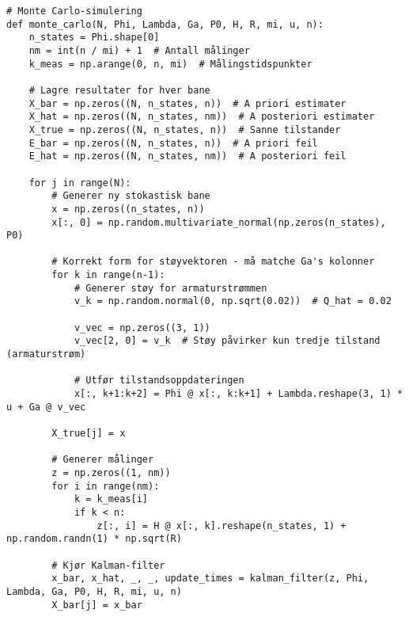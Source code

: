 \documentclass[a4paper,12pt]{article}
\theoremstyle{plain}
\begin{document}
\lstset{language=Python, numbers=left}
\begin{lstlisting}
# Monte Carlo-simulering
def monte_carlo(N, Phi, Lambda, Ga, P0, H, R, mi, u, n):
    n_states = Phi.shape[0]
    nm = int(n / mi) + 1  # Antall målinger
    k_meas = np.arange(0, n, mi)  # Målingstidspunkter

    # Lagre resultater for hver bane
    X_bar = np.zeros((N, n_states, n))  # A priori estimater
    X_hat = np.zeros((N, n_states, nm))  # A posteriori estimater
    X_true = np.zeros((N, n_states, n))  # Sanne tilstander
    E_bar = np.zeros((N, n_states, n))  # A priori feil
    E_hat = np.zeros((N, n_states, nm))  # A posteriori feil

    for j in range(N):
        # Generer ny stokastisk bane
        x = np.zeros((n_states, n))
        x[:, 0] = np.random.multivariate_normal(np.zeros(n_states), P0)
        
        # Korrekt form for støyvektoren - må matche Ga's kolonner
        for k in range(n-1):
            # Generer støy for armaturstrømmen
            v_k = np.random.normal(0, np.sqrt(0.02))  # Q_hat = 0.02
            
            v_vec = np.zeros((3, 1))
            v_vec[2, 0] = v_k  # Støy påvirker kun tredje tilstand (armaturstrøm)
            
            # Utfør tilstandsoppdateringen
            x[:, k+1:k+2] = Phi @ x[:, k:k+1] + Lambda.reshape(3, 1) * u + Ga @ v_vec
        
        X_true[j] = x

        # Generer målinger
        z = np.zeros((1, nm))
        for i in range(nm):
            k = k_meas[i]
            if k < n:
                z[:, i] = H @ x[:, k].reshape(n_states, 1) + np.random.randn(1) * np.sqrt(R)

        # Kjør Kalman-filter
        x_bar, x_hat, _, _, update_times = kalman_filter(z, Phi, Lambda, Ga, P0, H, R, mi, u, n)
        X_bar[j] = x_bar
\end{lstlisting}
\end{document}
